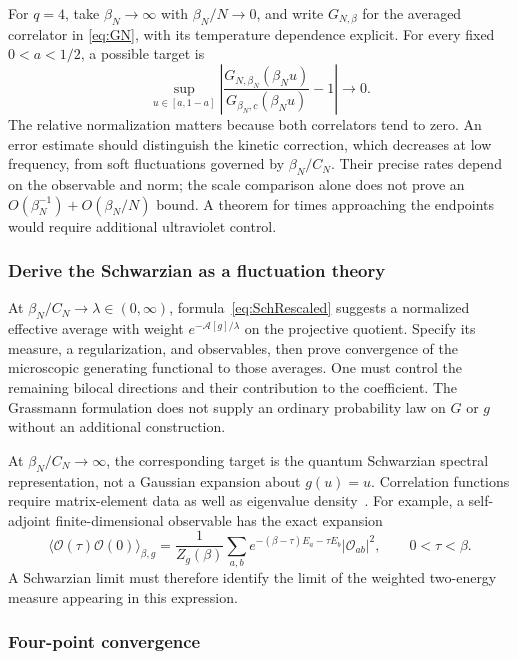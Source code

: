 \documentclass[11pt]{article}
\numberwithin{equation}{section}
\theoremstyle{exposition}
\theoremstyle{result}
\begin{document}
For $q=4$, take $\beta_N\to\infty$ with $\beta_N/N\to0$, and write $G_{N,\beta}$ for the averaged correlator in \eqref{eq:GN}, with its temperature dependence explicit. For every fixed $0<a<1/2$, a possible target is
\begin{equation}
\sup_{u\in[a,1-a]}
\left|\frac{G_{N,\beta_N}(\beta_Nu)}{G_{\beta_N,c}(\beta_Nu)}-1\right|
\longrightarrow0.
\label{eq:uniformConformalTarget}
\end{equation}
The relative normalization matters because both correlators tend to zero. An error estimate should distinguish the kinetic correction, which decreases at low frequency, from soft fluctuations governed by $\beta_N/C_N$. Their precise rates depend on the observable and norm; the scale comparison alone does not prove an $O(\beta_N^{-1})+O(\beta_N/N)$ bound. A theorem for times approaching the endpoints would require additional ultraviolet control.

\subsubsection{Derive the Schwarzian as a fluctuation theory}

At $\beta_N/C_N\to\lambda\in(0,\infty)$, formula~\eqref{eq:SchRescaled} suggests a normalized effective average with weight $e^{-\mathcal A[g]/\lambda}$ on the projective quotient. Specify its measure, a regularization, and observables, then prove convergence of the microscopic generating functional to those averages. One must control the remaining bilocal directions and their contribution to the coefficient. The Grassmann formulation does not supply an ordinary probability law on $G$ or $g$ without an additional construction.

At $\beta_N/C_N\to\infty$, the corresponding target is the quantum Schwarzian spectral representation, not a Gaussian expansion about $g(u)=u$. Correlation functions require matrix-element data as well as eigenvalue density~\cite{MertensTuriaciVerlinde}. For example, a self-adjoint finite-dimensional observable has the exact expansion
\begin{equation*}
\langle\mathcal O(\tau)\mathcal O(0)\rangle_{\beta,g}
=\frac1{Z_g(\beta)}\sum_{a,b}
e^{-(\beta-\tau)E_a-\tau E_b}|\mathcal O_{ab}|^2,
\qquad 0<\tau<\beta.
\end{equation*}
A Schwarzian limit must therefore identify the limit of the weighted two-energy measure appearing in this expression.

\subsubsection{Four-point convergence}
\end{document}
